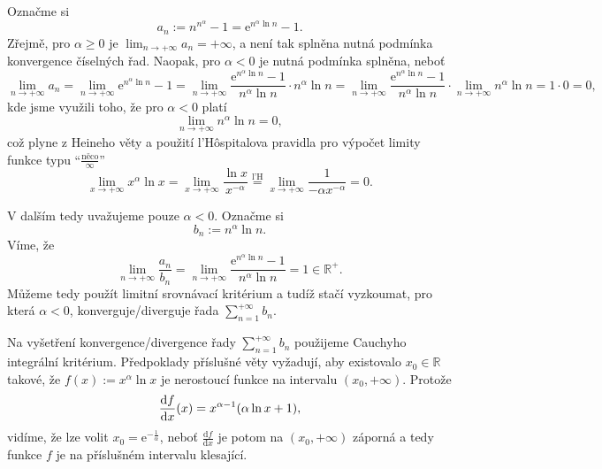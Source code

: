 \documentclass[answers]{exam}
\let\originalleft\left
\let\originalright\right
\renewcommand{\left}{\mathopen{}\mathclose\bgroup\originalleft}
\renewcommand{\right}{\aftergroup\egroup\originalright}
\begin{document}
\begin{questions}
  \begin{solution}
  	Označme si
  	\begin{equation*}
  		a_n
  		:=
  		n^{n^{\alpha}} - 1
  		=
  		\mathrm{e}^{n^{\alpha} \ln n} - 1.
  	\end{equation*}
  	Zřejmě, pro $\alpha \ge 0$ je $\lim_{n \to +\infty} a_n = + \infty$, a není tak splněna nutná podmínka konvergence číselných řad. Naopak, pro $\alpha < 0$ je nutná podmínka splněna, neboť
  	\begin{equation*}
  		\lim_{n \to +\infty}
  		a_n
  		=
  		\lim_{n \to +\infty}
  		\mathrm{e}^{n^{\alpha} \ln n} - 1
  		=
  		\lim_{n \to +\infty}
  		\frac{\mathrm{e}^{n^{\alpha} \ln n} - 1}{n^{\alpha} \ln n} \cdot n^{\alpha} \ln n
  		=
  		\lim_{n \to +\infty}
  		\frac{\mathrm{e}^{n^{\alpha} \ln n} - 1}{n^{\alpha} \ln n}
  		\cdot
  		\lim_{n \to +\infty}
  		n^{\alpha} \ln n
  		=
  		1 \cdot 0
  		=
  		0,  		
  	\end{equation*}
  	kde jsme využili toho, že pro $\alpha < 0$  platí
  	\begin{equation*}
  		\lim_{n \to +\infty}
  		n^{\alpha} \ln n
  		=
  		0,
  	\end{equation*}
  	což plyne z Heineho věty a použití l'Hôspitalova pravidla pro výpočet limity funkce typu ``$\frac{\textrm{něco}}{\infty}$''
  	\begin{equation*}
  		\lim_{x \to +\infty}
  		x^{\alpha} \ln x
  		=
  		\lim_{x \to +\infty}
  		\frac{\ln x}{x^{-\alpha}}
  		\stackrel{\text{l'H}}{=}
  		\lim_{x \to +\infty}
  		\frac{1}{-\alpha x^{-\alpha}}
  		=
  		0.
  	\end{equation*}
  	
  	V dalším tedy uvažujeme pouze $\alpha < 0$. Označme si
  	\begin{equation*}
  		b_n := n^{\alpha} \ln n.
  	\end{equation*}
  	Víme, že
  	\begin{equation*}
  		\lim_{n \to +\infty}
  		\frac{a_n}{b_n}
  		=
  		\lim_{n \to +\infty}
  		\frac{\mathrm{e}^{n^{\alpha} \ln n} - 1}{n^{\alpha} \ln n}
  		=
  		1
  		\in
  		\mathbb{R}^+.
  	\end{equation*}
  	Můžeme tedy použít limitní srovnávací kritérium a tudíž stačí vyzkoumat, pro která $\alpha < 0$, konverguje/diverguje řada $\sum_{n = 1}^{+\infty} b_n$.
  	
  	Na vyšetření konvergence/divergence řady $\sum_{n = 1}^{+\infty} b_n$ použijeme Cauchyho integrální kritérium. Předpoklady příslušné věty vyžadují, aby existovalo $x_0 \in \mathbb{R}$ takové, že $f(x) := x^{\alpha} \ln x$ je nerostoucí funkce na intervalu $(x_0, +\infty)$. Protože
  	\begin{equation*}
  		\frac{\mathrm{d}f}{\mathrm{d}x}(x)
  		=
  		x^{\alpha - 1} \left( \alpha \ln x + 1 \right),  		
  	\end{equation*}
  	vidíme, že lze volit $x_0 = \mathrm{e}^{-\frac{1}{\alpha}}$, neboť $\frac{\mathrm{d}f}{\mathrm{d}x}$ je potom na $(x_0, +\infty)$ záporná a tedy funkce $f$ je na příslušném intervalu klesající.
  	

\end{solution}
\end{questions}
\end{document}
